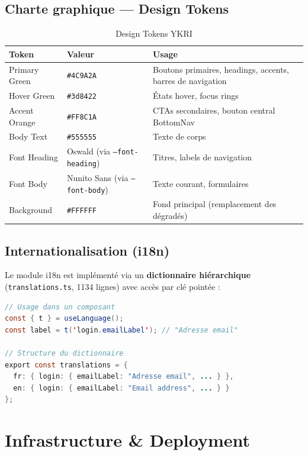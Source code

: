 \documentclass[12pt, a4paper]{article}
\begin{document}
\subsection{Charte graphique — Design Tokens}

\begin{table}[h!]
\centering
\caption{Design Tokens YKRI}
\begin{tabularx}{\textwidth}{l l X}
\toprule
\textbf{Token} & \textbf{Valeur} & \textbf{Usage} \\
\midrule
Primary Green    & \texttt{\#4C9A2A} & Boutons primaires, headings, accents, barres de navigation \\
Hover Green      & \texttt{\#3d8422} & États hover, focus rings \\
Accent Orange    & \texttt{\#FF8C1A} & CTAs secondaires, bouton central BottomNav \\
Body Text        & \texttt{\#555555} & Texte de corps \\
Font Heading     & Oswald (via \texttt{--font-heading}) & Titres, labels de navigation \\
Font Body        & Nunito Sans (via \texttt{--font-body}) & Texte courant, formulaires \\
Background       & \texttt{\#FFFFFF} & Fond principal (remplacement des dégradés) \\
\bottomrule
\end{tabularx}
\end{table}

\subsection{Internationalisation (i18n)}

Le module i18n est implémenté via un \textbf{dictionnaire hiérarchique} (\texttt{translations.ts}, 1134 lignes) avec accès par clé pointée :

\begin{lstlisting}[language=Java, caption=Systeme i18n]
// Usage dans un composant
const { t } = useLanguage();
const label = t('login.emailLabel'); // "Adresse email"

// Structure du dictionnaire
export const translations = {
  fr: { login: { emailLabel: "Adresse email", ... } },
  en: { login: { emailLabel: "Email address", ... } }
};
\end{lstlisting}

\section{Infrastructure \& Deployment}
\end{document}
